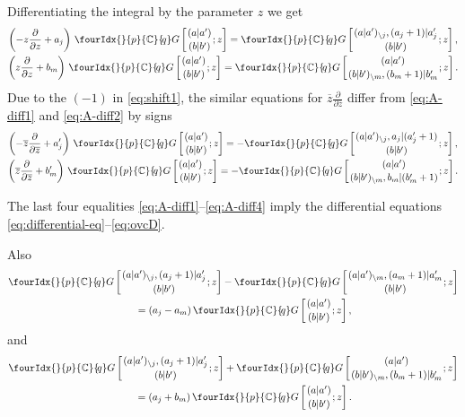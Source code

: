 \documentclass[pdftex]{sigma}
\numberwithin{equation}{section}
\newcommand{\Gc}[2]{\fourIdx{}{#1}{\C}{\!#2}G}
\def\ov{\overline}
\def\C {{\mathbb C }}
\begin{document}
Differentiating the integral by the parameter $z$ we get
\begin{subequations}
\begin{gather}
\left({-}z\frac\partial{\partial z}+a_j\right)\,
\Gc{p}{q}\left[\genfrac{}{}{0pt}{}{(a|a')}{(b|b')};z\right]
 =\Gc{p}{q}\left[\genfrac{}{}{0pt}{}{(a|a')_{\setminus j},(a_j+1)|a_j'}
{(b|b')};z\right],
\label{eq:A-diff1} \\
\left(z\frac\partial{\partial z}+b_m\right)\,
\Gc{p}{q}\left[\genfrac{}{}{0pt}{}{(a|a')}{(b|b')};z\right]
 =\Gc{p}{q}\left[\genfrac{}{}{0pt}{}{(a|a')}
{(b|b')_{\setminus m},(b_m+1)|b_m'};z\right].
\label{eq:A-diff2}
\end{gather}
\end{subequations}
Due to the $(-1)$ in \eqref{eq:shift1}, the similar equations for
$\ov z\frac{\partial}{\partial \ov z}$ differ from
\eqref{eq:A-diff1} and \eqref{eq:A-diff2} by signs
\begin{subequations}
\begin{gather}
\left({-}\ov z\frac\partial{\partial \ov z}+a_j'\right)\,
\Gc{p}{q}\left[\genfrac{}{}{0pt}{}{(a|a')}{(b|b')};z\right]
 =- \Gc{p}{q}\left[\genfrac{}{}{0pt}{}{(a|a')_{\setminus j},a_j|(a_j'+1)}
{(b|b')};z\right],
\label{eq:A-diff3} \\
\left(\ov z\frac\partial{\partial \ov z}+b'_m\right)\,
\Gc{p}{q}\left[\genfrac{}{}{0pt}{}{(a|a')}{(b|b')};z\right]
 =-
\Gc{p}{q}\left[\genfrac{}{}{0pt}{}{(a|a')}
{(b|b')_{\setminus m},b_m|(b_m'+1)};z\right].
\label{eq:A-diff4}
\end{gather}
\end{subequations}

The last four equalities \eqref{eq:A-diff1}--\eqref{eq:A-diff4}
imply the differential equations \eqref{eq:differential-eq}--\eqref{eq:ovcD}.

Also
\begin{gather*}
\Gc{p}{q}\left[\genfrac{}{}{0pt}{}{(a|a')_{\setminus j}, (a_j+1)|a_j'}
{(b|b')};z\right]
- \Gc{p}{q}\left[\genfrac{}{}{0pt}{}{(a|a')_{\setminus m}, (a_m+1)|a_m'}
{(b|b')};z\right] \\
\qquad{} =(a_j-a_m) \, \Gc{p}{q}\left[\genfrac{}{}{0pt}{}{(a|a')}{(b|b')};z\right],
\end{gather*}
and
\begin{gather*}
\Gc{p}{q}\left[\genfrac{}{}{0pt}{}{(a|a')_{\setminus j}, (a_j+1)|a_j'}
{(b|b')};z\right]
+ \Gc{p}{q}\left[\genfrac{}{}{0pt}{}{(a|a')}
{(b|b')_{\setminus m}, (b_m+1)|b_m'};z\right] \\
\qquad{} =(a_j+b_m) \,
\Gc{p}{q}\left[\genfrac{}{}{0pt}{}{(a|a')}{(b|b')};z\right].
\end{gather*}
\end{document}
